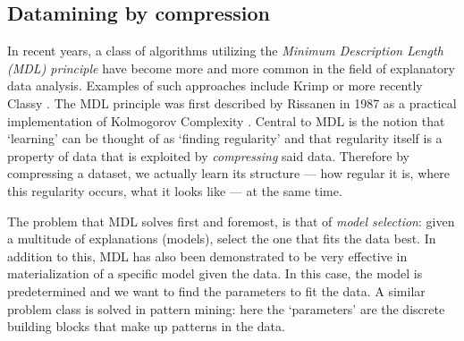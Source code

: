 \documentclass{llncs}
\begin{document}


\subsection{Datamining by compression}
 
In recent years, a class of algorithms utilizing the \emph{Minimum Description Length (MDL) principle} \cite{rissanenmdl,grunwaldmdl} have become more and more common in the field of explanatory data analysis. Examples of such approaches include Krimp \cite{krimp} or more recently Classy \cite{classy}. The  MDL principle was first described by Rissanen in 1987 \cite{rissanenmdl} as a practical implementation of Kolmogorov Complexity \cite{kolmogorov}. Central to MDL is the notion that `learning' can be thought of as `finding regularity' and that regularity itself is a property of data that is exploited by \emph{compressing} said data. Therefore by compressing a dataset, we actually learn its structure --- how regular it is, where this regularity occurs, what it looks like --- at the same time. %

The problem that MDL solves first and foremost, is that of \emph{model selection}: given a multitude of explanations (models), select the one that fits the data best. In addition to this, MDL has also been demonstrated to be very effective in materialization of a specific model given the data. In this case, the model is predetermined and we want to find the parameters to fit the data. A similar problem class is solved in pattern mining: here the `parameters' are the discrete building blocks that make up patterns in the data. 
 
\end{document}
